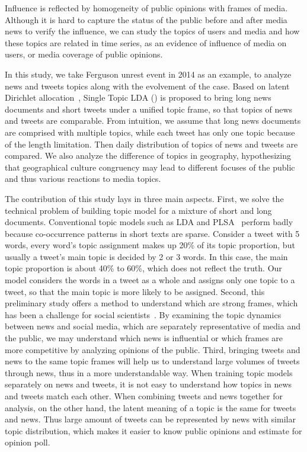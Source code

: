 Influence is reflected by homogeneity of public opinions with frames of media. Although it is hard to capture the status of the public before and after media news to verify the influence, we can study the topics of users and media and how these topics are related in time series, as an evidence of influence of media on users, or media coverage of public opinions.

In this study, we take Ferguson unrest event in 2014 as an example, to analyze news and tweets topics along with the evolvement of the case. Based on latent Dirichlet allocation~\cite[LDA]{blei2003latent}, Single Topic LDA (\stlda) is proposed to bring long news documents and short tweets under a unified topic frame, so that topics of news and tweets are comparable. From intuition, we assume that long news documents are comprised with multiple topics, while each tweet has only one topic because of the length limitation. Then daily distribution of topics of news and tweets are compared. We also analyze the difference of topics in geography, hypothesizing that geographical culture congruency may lead to different focuses of the public and thus various reactions to media topics.

The contribution of this study lays in three main aspects. First, we solve the technical problem of building topic model for a mixture of short and long documents. Conventional topic models such as LDA and PLSA~\cite{hofmann1999probabilistic} perform badly because co-occurrence patterns in short texts are sparse. Consider a tweet with 5 words, every word's topic assignment makes up 20\% of its topic proportion, but usually a tweet's main topic is decided by 2 or 3 words. In this case, the main topic proportion is about 40\% to 60\%, which does not reflect the truth. Our model considers the words in a tweet as a whole and assigns only one topic to a tweet, so that the main topic is more likely to be assigned.
Second, this preliminary study offers a method to understand which are strong frames, which has been a challenge for social scientists~\cite{chong2007framing}. By examining the topic dynamics between news and social media, which are separately representative of media and the public, we may understand which news is influential or which frames are more competitive by analyzing opinions of the public.
Third, bringing tweets and news to the same topic frames will help us to understand large volumes of tweets through news, thus in a more understandable way. When training topic models separately on news and tweets, it is not easy to understand how topics in news and tweets match each other. When combining tweets and news together for analysis, on the other hand, the latent meaning of a topic is the same for tweets and news. Thus large amount of tweets can be represented by news with similar topic distribution, which makes it easier to know public opinions and estimate for opinion poll.
